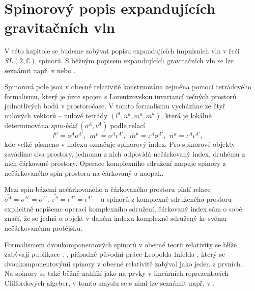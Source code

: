 \chapter{Spinorový popis expandujících gravitačních vln}
V této kapitole se budeme zabývat popisu expandujících impulsních vln v řeči $SL(2, \mathbb{C})$ spinorů.
S běžným popisem expandujících gravitačních vln se lze seznámit např. v
\cite{Podolsky_1999} nebo \cite{Podolsky:2016mqg}.

Spinorová pole jsou v obecné relativitě konstruována zejména pomocí tetrádového formalismu,
který je úzce spojen s Lorentzovskou invariancí tečných prostorů jednotlivých bodů v prostoročase.
V tomto formalismu vycházíme ze čtyř nulových vektorů -- nulové tetrády $(l^a, n^a, m^a, \bar{m}^a)$,
která je lokálně determinována \emph{spin-bází} $(o^A, \iota^A)$ podle relací
\begin{equation}
    \label{eq:tetrad-spinor-basis-relation}
    l^\mu = o^A o^{A'}, ~~ m^\mu = o^A \iota^{A'}, ~~ \bar{m}^\mu = \iota^A o^{A'}, ~~ n^\mu = \iota^A \iota^{A'},
\end{equation}
kde velké písmeno v indexu označuje spinorový index. Pro spinorové objekty zavádíme dva prostory,
jednomu z nich odpovídá nečárkovaný index, druhému z nich čárkované prostory. Operace komplexního sdružení
mapuje spinory z nečárkovaného spin-prostoru na čárkovaný a naopak.

Mezi spin-bázemi nečárkovaného a čárkovaného prostoru platí relace $\bar{o^A} = \bar{o}^{A'} = o^{A'}$, $\bar{\iota^A} = \bar{\iota}^{A'} = \iota^{A'}$ --
u spinorů z komplexně sdruženého prostoru explicitně nepíšeme operaci komplexního sdružení, čárkovaný index sám o sobě značí,
že se jedná o objekt v daném indexu komplexně sdružený ke svému nečárkovanému protějšku.

Formalismem dvoukomponentových spinorů v obecné teorii relativity se blíže zabývají publikace
\cite{penrose_rindler_1984}, \cite{doi:10.1142/5222}, případně původní práce Leopolda Infelda \cite{zbMATH03005509},
který se dvoukomponentovými spinory v obecné relativitě zabýval jako jeden z prvních. Na spinory se také běžně
nahlíží jako na prvky v lineárních reprezentacích Cliffordových algeber, v tomto smyslu se s nimi lze seznámit např. v \cite{fecko_2006}.

